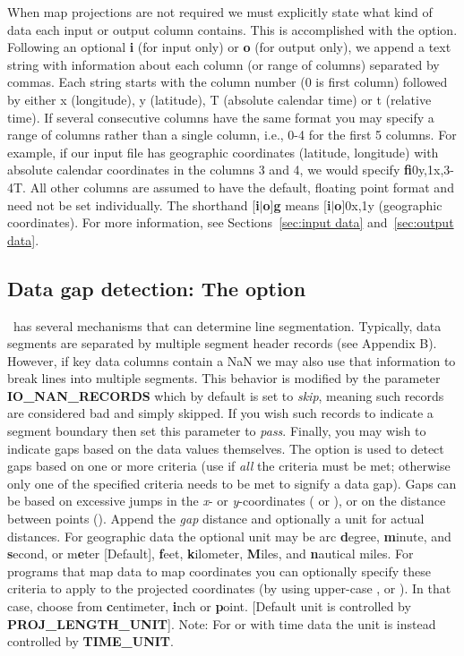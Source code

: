 When map projections are not required we must explicitly state
what kind of data each input or output column contains.  This is accomplished with
the  option.  Following an optional \textbf{i} (for input only) or \textbf{o} (for output
only), we append a text string with information about each column (or range of columns) separated by commas.
Each string starts with the column number (0 is first column) followed by either
x (longitude), y (latitude), T (absolute calendar time) or t (relative time).  If
several consecutive columns have the same format you may specify a range of columns
rather than a single column, i.e., 0-4 for the first 5 columns.  For example, if our
input file has geographic coordinates (latitude, longitude) with absolute calendar
coordinates in the columns 3 and 4, we would specify \textbf{fi}0y,1x,3-4T.  All other columns
are assumed to have the default, floating point format and need not be set individually.
The shorthand [\textbf{i}$|$\textbf{o}]\textbf{g} means [\textbf{i}$|$\textbf{o}]0x,1y (geographic coordinates).
For more information, see Sections~\ref{sec:input data} and~\ref{sec:output data}.

\subsection{Data gap detection: The  option}
\label{sec:gap}
\GMT\ has several mechanisms that can determine line segmentation.  Typically, data segments are
separated by multiple segment header records (see Appendix B).  However, if key data
columns contain a NaN we may also use that information to break lines into multiple
segments.  This behavior is modified by the parameter \textbf{IO\_NAN\_RECORDS} which
by default is set to {\it skip}, meaning such records are considered bad and simply
skipped.  If you wish such records to indicate a segment boundary then set this parameter
to {\it pass}.  Finally, you may wish to indicate gaps based on the data values themselves.
The  option is used to detect gaps based on one or more criteria (use  if
\emph{all} the criteria must be met; otherwise only one of the specified criteria needs
to be met to signify a data gap).  Gaps can be based on excessive jumps in the {\it x}- or
{\it y}-coordinates ( or ), or on the distance between points ().
Append the {\it gap} distance and optionally a unit for actual distances.
For geographic data the optional unit may be arc {\bf d}egree, {\bf m}inute, and {\bf s}econd,
or m{\bf e}ter [Default], {\bf f}eet, {\bf k}ilometer, {\bf M}iles, and {\bf n}autical miles.
For programs that map data to map coordinates you can optionally specify these criteria to apply to
the projected coordinates (by using upper-case ,  or ).
In that case, choose from {\bf c}entimeter, {\bf i}nch or {\bf p}oint.
[Default unit is controlled by \textbf{PROJ\_LENGTH\_UNIT}].
Note: For  or  with time data the unit is instead controlled by \textbf{TIME\_UNIT}.

